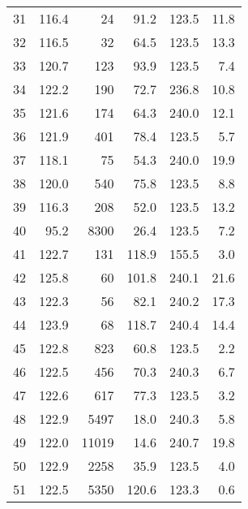 \begin{tabular}{|r|r|r|r|r|r|}
31 &  116.4 & 24 & 91.2 & 123.5 & 11.8\\
32 &  116.5 & 32 & 64.5 & 123.5 & 13.3\\
33 &  120.7 & 123 & 93.9 & 123.5 & 7.4\\
34 &  122.2 & 190 & 72.7 & 236.8 & 10.8\\
35 &  121.6 & 174 & 64.3 & 240.0 & 12.1\\
36 &  121.9 & 401 & 78.4 & 123.5 & 5.7\\
37 &  118.1 & 75 & 54.3 & 240.0 & 19.9\\
38 &  120.0 & 540 & 75.8 & 123.5 & 8.8\\
39 &  116.3 & 208 & 52.0 & 123.5 & 13.2\\
40 &  95.2 & 8300 & 26.4 & 123.5 & 7.2\\
41 &  122.7 & 131 & 118.9 & 155.5 & 3.0\\
42 &  125.8 & 60 & 101.8 & 240.1 & 21.6\\
43 &  122.3 & 56 & 82.1 & 240.2 & 17.3\\
44 &  123.9 & 68 & 118.7 & 240.4 & 14.4\\
45 &  122.8 & 823 & 60.8 & 123.5 & 2.2\\
46 &  122.5 & 456 & 70.3 & 240.3 & 6.7\\
47 &  122.6 & 617 & 77.3 & 123.5 & 3.2\\
48 &  122.9 & 5497 & 18.0 & 240.3 & 5.8\\
49 &  122.0 & 11019 & 14.6 & 240.7 & 19.8\\
50 &  122.9 & 2258 & 35.9 & 123.5 & 4.0\\
51 &  122.5 & 5350 & 120.6 & 123.3 & 0.6\\
\hline
\end{tabular}

